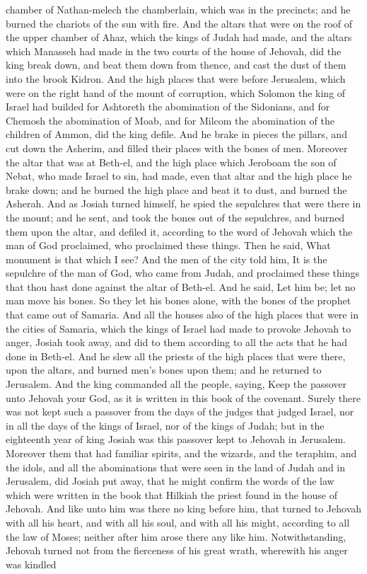 chamber of Nathan-melech the chamberlain, which was in the precincts; and he burned the chariots of the sun with fire. And the altars that were on the roof of the upper chamber of Ahaz, which the kings of Judah had made, and the altars which Manasseh had made in the two courts of the house of Jehovah, did the king break down, and beat them down from thence, and cast the dust of them into the brook Kidron. And the high places that were before Jerusalem, which were on the right hand of the mount of corruption, which Solomon the king of Israel had builded for Ashtoreth the abomination of the Sidonians, and for Chemosh the abomination of Moab, and for Milcom the abomination of the children of Ammon, did the king defile. And he brake in pieces the pillars, and cut down the Asherim, and filled their places with the bones of men.  Moreover the altar that was at Beth-el, and the high place which Jeroboam the son of Nebat, who made Israel to sin, had made, even that altar and the high place he brake down; and he burned the high place and beat it to dust, and burned the Asherah. And as Josiah turned himself, he spied the sepulchres that were there in the mount; and he sent, and took the bones out of the sepulchres, and burned them upon the altar, and defiled it, according to the word of Jehovah which the man of God proclaimed, who proclaimed these things. Then he said, What monument is that which I see? And the men of the city told him, It is the sepulchre of the man of God, who came from Judah, and proclaimed these things that thou hast done against the altar of Beth-el. And he said, Let him be; let no man move his bones. So they let his bones alone, with the bones of the prophet that came out of Samaria. And all the houses also of the high places that were in the cities of Samaria, which the kings of Israel had made to provoke Jehovah to anger, Josiah took away, and did to them according to all the acts that he had done in Beth-el. And he slew all the priests of the high places that were there, upon the altars, and burned men’s bones upon them; and he returned to Jerusalem.  And the king commanded all the people, saying, Keep the passover unto Jehovah your God, as it is written in this book of the covenant. Surely there was not kept such a passover from the days of the judges that judged Israel, nor in all the days of the kings of Israel, nor of the kings of Judah; but in the eighteenth year of king Josiah was this passover kept to Jehovah in Jerusalem.  Moreover them that had familiar spirits, and the wizards, and the teraphim, and the idols, and all the abominations that were seen in the land of Judah and in Jerusalem, did Josiah put away, that he might confirm the words of the law which were written in the book that Hilkiah the priest found in the house of Jehovah. And like unto him was there no king before him, that turned to Jehovah with all his heart, and with all his soul, and with all his might, according to all the law of Moses; neither after him arose there any like him.  Notwithstanding, Jehovah turned not from the fierceness of his great wrath, wherewith his anger was kindled 